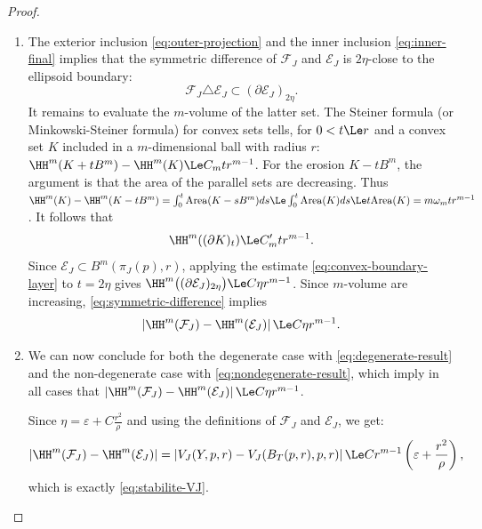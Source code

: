 \begin{proof}
\begin{enumerate}
      \item The exterior inclusion \eqref{eq:outer-projection} and the
        inner inclusion \eqref{eq:inner-final} implies that the
        symmetric difference of $\mathcal{F}_J$ and $\mathcal{E}_J$ is
        $2\eta$-close to the ellipsoid boundary:
        \begin{equation}
          \label{eq:symmetric-difference}
          \mathcal{F}_J\triangle\mathcal{E}_J
          \subset
          (\partial\mathcal{E}_J)_{2\eta}.
        \end{equation}
        It remains to evaluate the $m$-volume of the latter set.  The
        Steiner formula (or Minkowski-Steiner formula) for convex sets
        tells, for $0<t \Le r$ and a convex set $K$ included in a
        $m$-dimensional ball with radius $r$: $\HH^m(K+tB^m) -
        \HH^m(K) \Le C_m t r^{m-1}$. For the erosion $K-tB^m$, the
        argument is that the area of the parallel sets are
        decreasing. Thus $\HH^m(K) - \HH^m (K-tB^m) = \int_0^t
        \mathrm{Area}(K-sB^m) ds \Le \int_0^t \mathrm{Area}(K) ds \Le
        t \mathrm{Area}(K) = m \omega_m tr^{m-1}$. It follows that
        \begin{equation}
          \label{eq:convex-boundary-layer}
          \HH^m((\partial K)_t)
          \Le C'_m t r^{m-1}.
        \end{equation}
        Since $\mathcal{E}_J \subset B^m(\pi_J(p),r)$, applying the
        estimate \eqref{eq:convex-boundary-layer} to $t=2\eta$ gives
        $\HH^m \bigl( (\partial\mathcal{E}_J)_{2\eta} \bigr) \Le C
        \eta r^{m-1}$.  Since $m$-volume are increasing,
        \eqref{eq:symmetric-difference} implies
        \begin{equation}
          \label{eq:nondegenerate-result}
          \left| \HH^m(\mathcal{F}_J) - \HH^m(\mathcal{E}_J) \right|
          \Le C\eta r^{m-1}.
        \end{equation}

      \item We can now conclude for both the degenerate case with
        \eqref{eq:degenerate-result} and the non-degenerate case
        with \eqref{eq:nondegenerate-result}, which imply in all cases that
        $\left|\HH^m(\mathcal{F}_J)-\HH^m(\mathcal{E}_J)\right|\Le
        C\eta r^{m-1}$.

        Since $\eta=\varepsilon+C\frac{r^2}{\rho}$ and using the
        definitions of $\mathcal{F}_J$ and $\mathcal{E}_J$, we get:
        \begin{equation*}
          \left| \HH^m(\mathcal{F}_J) - \HH^m(\mathcal{E}_J) \right| =
          \left| V_J(Y,p,r)- V_J(B_T(p,r),p,r)\right| \Le C r^{m-1}
          \left( \varepsilon+\frac{r^2}{\rho} \right),
        \end{equation*}
        which is exactly \eqref{eq:stabilite-VJ}.


\end{enumerate}
\end{proof}
